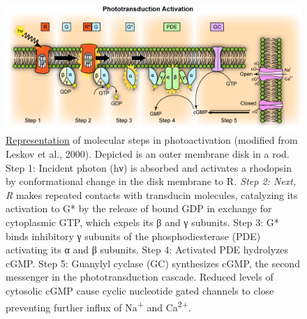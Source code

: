 \begin{figure}

{\centering \includegraphics[width=0.7\linewidth]{./figures/visual/Phototransduction} 

}

\caption{\href{https://commons.wikimedia.org/wiki/File:Phototransduction.png}{Representation} of molecular steps in photoactivation (modified from Leskov et al., 2000). Depicted is an outer membrane disk in a rod. Step 1: Incident photon (hν) is absorbed and activates a rhodopsin by conformational change in the disk membrane to R\emph{. Step 2: Next, R} makes repeated contacts with transducin molecules, catalyzing its activation to G* by the release of bound GDP in exchange for cytoplasmic GTP, which expels its β and γ subunits. Step 3: G* binds inhibitory γ subunits of the phosphodiesterase (PDE) activating its α and β subunits. Step 4: Activated PDE hydrolyzes cGMP. Step 5: Guanylyl cyclase (GC) synthesizes cGMP, the second messenger in the phototransduction cascade. Reduced levels of cytosolic cGMP cause cyclic nucleotide gated channels to close preventing further influx of Na\textsuperscript{+} and Ca\textsuperscript{2+}.}\label{fig:molsteps}
\end{figure}

